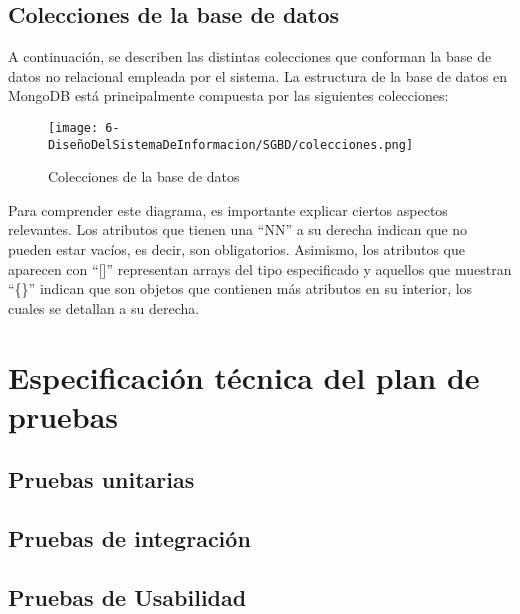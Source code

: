 \subsection{Colecciones de la base de datos}
A continuación, se describen las distintas colecciones que conforman la base de datos no relacional empleada por el sistema. La estructura de la base de datos en MongoDB está principalmente compuesta por las siguientes colecciones:
\begin{figure}[H]
	\centering
	\texttt{[image: 6-DiseñoDelSistemaDeInformacion/SGBD/colecciones.png]}
	\caption{Colecciones de la base de datos}
\end{figure}
Para comprender este diagrama, es importante explicar ciertos aspectos relevantes. Los atributos que tienen una “NN” a su derecha indican que no pueden estar vacíos, es decir, son obligatorios. Asimismo, los atributos que aparecen con “[]” representan arrays del tipo especificado y aquellos que muestran “\{\}” indican que son objetos que contienen más atributos en su interior, los cuales se detallan a su derecha.

\section{Especificación técnica del plan de pruebas}
\subsection{Pruebas unitarias}

\subsection{Pruebas de integración}

\subsection{Pruebas de Usabilidad}

